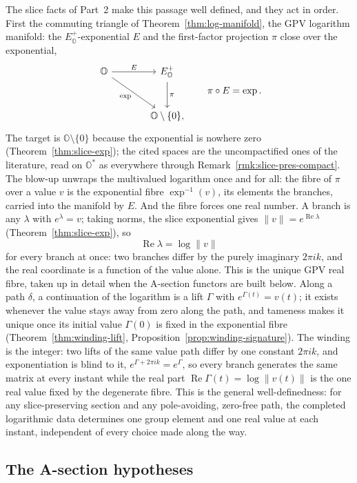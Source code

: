 \documentclass[11pt]{article}
\newcommand{\OO}{\mathbb{O}}
\theoremstyle{plain}
\theoremstyle{definition}
\theoremstyle{remark}
\begin{document}
The slice facts of Part~2 make this passage well defined, and they act in
order. First the commuting triangle of Theorem~\ref{thm:log-manifold}, the
GPV logarithm manifold: the $E^{+}_{\OO}$-exponential $E$ and the
first-factor projection $\pi$ close over the exponential,
\[
\begin{tikzcd}[column sep=large,row sep=large]
\OO \arrow[r,"E"] \arrow[dr,"\exp"'] &
E^{+}_{\OO} \arrow[d,"\pi"]\\
& \OO\setminus\{0\},
\end{tikzcd}
\qquad \pi\circ E=\exp.
\]
The target is $\OO\setminus\{0\}$ because the exponential is nowhere
zero (Theorem~\ref{thm:slice-exp}); the cited spaces are the
uncompactified ones of the literature, read on $\OO^{*}$ as everywhere
through Remark~\ref{rmk:slice-pres-compact}. The blow-up unwraps the
multivalued logarithm once and for all: the fibre of $\pi$ over a value
$v$ is the exponential fibre $\exp^{-1}(v)$, its elements the branches,
carried into the manifold by $E$. And the fibre forces one real number.
A branch is any $\lambda$ with $e^{\lambda}=v$; taking norms, the slice
exponential gives $\lVert v\rVert=e^{\operatorname{Re}\lambda}$
(Theorem~\ref{thm:slice-exp}), so
\[
  \operatorname{Re}\lambda=\log\lVert v\rVert
\]
for every branch at once: two branches differ by the purely imaginary
$2\pi ik$, and the real coordinate is a function of the value alone.
This is the unique GPV real fibre, taken up in detail when the
A-section functors are built below. Along a path $\delta$, a continuation of the
logarithm is a lift $\Gamma$ with $e^{\Gamma(t)}=v(t)$; it exists whenever the value stays
away from zero along the path, and tameness makes it unique once its initial value $\Gamma(0)$ is fixed in the exponential fibre
(Theorem~\ref{thm:winding-lift}, Proposition~\ref{prop:winding-signature}). The winding is
the integer: two lifts of the same value path differ by one constant $2\pi ik$, and
exponentiation is blind to it, $e^{\Gamma+2\pi ik}=e^{\Gamma}$, so every branch
generates the same matrix at every instant while the real part
$\operatorname{Re}\Gamma(t)=\log\lVert v(t)\rVert$ is the one real value fixed by the
degenerate fibre. This is the general well-definedness: for any slice-preserving section
and any pole-avoiding, zero-free path, the completed logarithmic data determines one group
element and one real value at each instant, independent of every choice made along the
way.

\subsection*{The A-section hypotheses}
\end{document}
